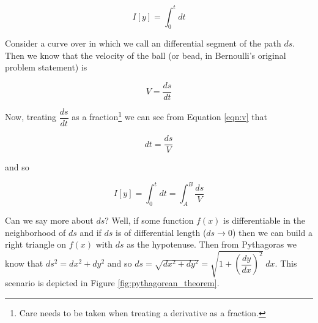 \documentclass{article}
\theoremstyle{definition}
\begin{document}
\begin{equation*}
I[y] = \int_{0}^{t} dt
\end{equation*}

\bigskip
\noindent
Consider a curve over in which we call an differential segment of
the path $ds$. Then we know that the velocity of the ball (or
bead, in Bernoulli's original problem statement) is

\begin{equation}
V = \dfrac{ds}{dt}
\label{eqn:v}
\end{equation}

\bigskip
\noindent
Now, treating $\dfrac{ds}{dt}$ as a fraction\footnote{Care needs
to be taken when treating a derivative as a fraction.} we can see
from Equation \ref{eqn:v} that

\bigskip
\begin{equation*}
dt = \dfrac{ds}{V}
\end{equation*}

\bigskip
\noindent
and so 

\begin{equation}
I[y] = \int_{0}^{t} dt = \int_A^B \dfrac{ds}{V}
\label{eqn:I}
\end{equation}


\bigskip
{ 
\noindent
Can we say more about $ds$? Well, if some function $f(x)$ is
differentiable in the neighborhood of $ds$ and if $ds$ is of
differential length ($ds \to 0$) then we can build a right
triangle on $f(x)$ with $ds$ as the hypotenuse. Then from
Pythagoras we know that $ds^2 = dx^2 + dy^2$ and so $ds =
\sqrt{dx^2 + dy^2} = \sqrt{1 + \left ( \dfrac{dy}{dx} \right )^2}
\; dx$.  This scenario is depicted in Figure
\ref{fig:pythagorean_theorem}.  \par}
\end{document}
